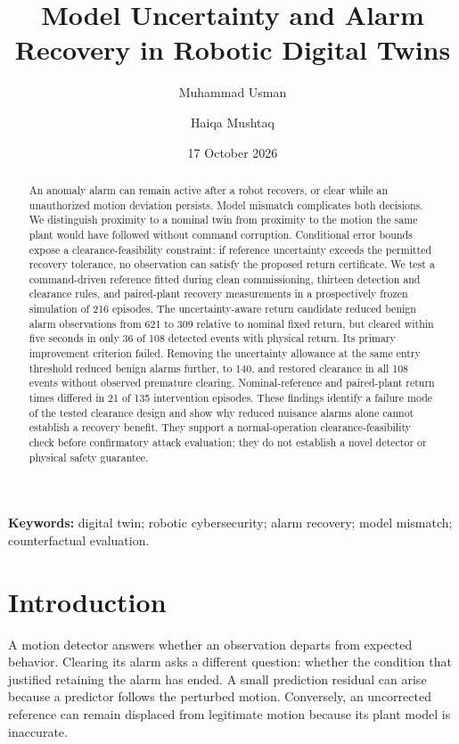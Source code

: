\documentclass[11pt]{article}
\title{Model Uncertainty and Alarm Recovery in Robotic Digital Twins}
\author{Muhammad Usman \and Haiqa Mushtaq}
\date{17 October 2026}
\begin{document}
\maketitle
\begin{abstract}
An anomaly alarm can remain active after a robot recovers, or clear while an unauthorized motion deviation persists. Model mismatch complicates both decisions. We distinguish proximity to a nominal twin from proximity to the motion the same plant would have followed without command corruption. Conditional error bounds expose a clearance-feasibility constraint: if reference uncertainty exceeds the permitted recovery tolerance, no observation can satisfy the proposed return certificate. We test a command-driven reference fitted during clean commissioning, thirteen detection and clearance rules, and paired-plant recovery measurements in a prospectively frozen simulation of 216 episodes. The uncertainty-aware return candidate reduced benign alarm observations from 621 to 309 relative to nominal fixed return, but cleared within five seconds in only 36 of 108 detected events with physical return. Its primary improvement criterion failed. Removing the uncertainty allowance at the same entry threshold reduced benign alarms further, to 140, and restored clearance in all 108 events without observed premature clearing. Nominal-reference and paired-plant return times differed in 21 of 135 intervention episodes. These findings identify a failure mode of the tested clearance design and show why reduced nuisance alarms alone cannot establish a recovery benefit. They support a normal-operation clearance-feasibility check before confirmatory attack evaluation; they do not establish a novel detector or physical safety guarantee.
\end{abstract}
\noindent\textbf{Keywords:} digital twin; robotic cybersecurity; alarm recovery; model mismatch; counterfactual evaluation.

\section{Introduction}
A motion detector answers whether an observation departs from expected behavior. Clearing its alarm asks a different question: whether the condition that justified retaining the alarm has ended. A small prediction residual can arise because a predictor follows the perturbed motion. Conversely, an uncorrected reference can remain displaced from legitimate motion because its plant model is inaccurate.
\end{document}

